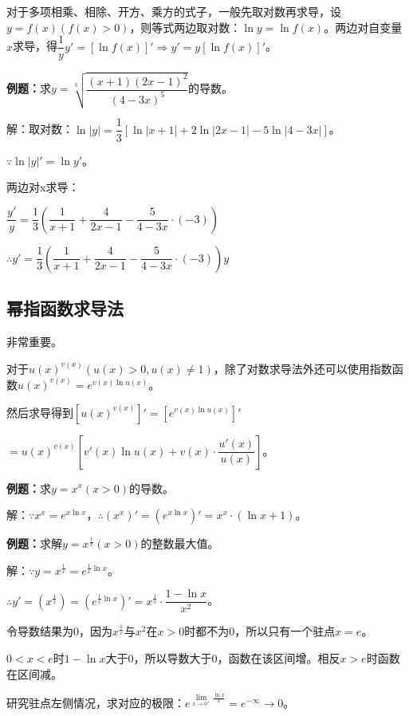 \documentclass[UTF8, 12pt]{ctexart}
\begin{document}
        对于多项相乘、相除、开方、乘方的式子，一般先取对数再求导，设$y=f(x)(f(x)>0)$，则等式两边取对数：$\ln y=\ln f(x)$。两边对自变量$x$求导，得$\dfrac{1}{y}y'=[\ln f(x)]'\Rightarrow y'=y[\ln f(x)]'$。

        \textbf{例题：}求$y=\sqrt[3]{\dfrac{(x+1)(2x-1)^2}{(4-3x)^5}}$的导数。

        解：取对数：$\ln\vert y\vert=\dfrac{1}{3}[\ln\vert x+1\vert+2\ln\vert 2x-1\vert-5\ln\vert 4-3x\vert]$。

        $\because \ln\vert y\vert'=\ln y'$。

        两边对x求导：\medskip

        $\dfrac{y'}{y}=\dfrac{1}{3}\left(\dfrac{1}{x+1}+\dfrac{4}{2x-1}-\dfrac{5}{4-3x}\cdot(-3)\right)$

        $\therefore y'=\dfrac{1}{3}\left(\dfrac{1}{x+1}+\dfrac{4}{2x-1}-\dfrac{5}{4-3x}\cdot(-3)\right)y$

        \subsection{幂指函数求导法}

        非常重要。

        对于$u(x)^{v(x)}(u(x)>0,u(x)\neq 1)$，除了对数求导法外还可以使用指数函数$u(x)^{v(x)}=e^{v(x)\ln u(x)}$。

        然后求导得到$[u(x)^{v(x)}]'=[e^{v(x)\ln u(x)}]'$

        $=u(x)^{v(x)}\left[v'(x)\ln u(x)+v(x)\cdot\dfrac{u'(x)}{u(x)}\right]$。

        \textbf{例题：}求$y=x^x(x>0)$的导数。

        解：$\because x^x=e^{x\ln x}$，$\therefore (x^x)'=(e^{x\ln x})'=x^x\cdot(\ln x+1)$。

        \textbf{例题：}求解$y=x^{\frac{1}{x}}(x>0)$的整数最大值。

        解：$\because y=x^{\frac{1}{x}}=e^{\frac{1}{x}\ln x}$。

        $\therefore y'=\left(x^{\frac{1}{x}}\right)=\left(e^{\frac{1}{x}\ln x}\right)'=x^{\frac{1}{x}}\cdot\dfrac{1-\ln x}{x^2}$。

        令导数结果为0，因为$x^{\frac{1}{x}}$与$x^2$在$x>0$时都不为0，所以只有一个驻点$x=e$。

        $0<x<e$时$1-\ln x$大于0，所以导数大于0，函数在该区间增。相反$x>e$时函数在区间减。

        研究驻点左侧情况，求对应的极限：$e^{\lim\limits_{x\to 0^+}\frac{\ln x}{x}}=e^{-\infty}\to 0$。
\end{document}
